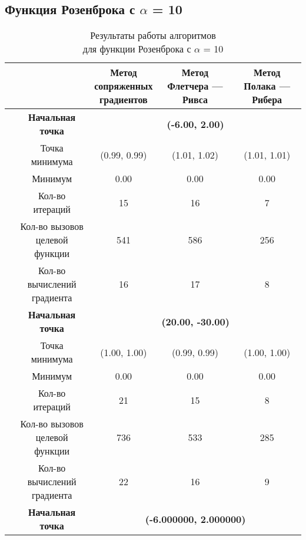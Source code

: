             \subsection{Функция Розенброка с $\alpha$ = 10}

\begin{table}[H]
        \centering
        \vspace*{-1.5em}
        \caption{Результаты работы алгоритмов\\для функции Розенброка с $\alpha$ = 10}
        \footnotesize
        \begin{tabular}{|c|c|c|c|c|}
        \hline
        & &\makecell{Метод\\сопряженных\\градиентов} &\makecell{Метод\\Флетчера --- Ривса} &\makecell{Метод\\Полака --- Рибера} \\
        \hline
	\multirow{10}{*}{\rotatebox[origin=c]{90}{$\varepsilon = 0.01$}}&\textbf{Начальная точка} &\multicolumn{3}{c|}{\textbf{(-6.00, 2.00)}}\\
	\cline{2-5}
	&Точка минимума &(0.99, 0.99) &(1.01, 1.02) &(1.01, 1.01) \\ 
	\cline{2-5}
	&Минимум &0.00 &0.00 &0.00 \\ 
	\cline{2-5}
	&Кол-во итераций &15 &16 &7 \\ 
	\cline{2-5}
	&\makecell{Кол-во вызовов\\целевой функции} &541 &586 &256 \\ 
	\cline{2-5}
	&\makecell{Кол-во вычислений\\градиента} &16 &17 &8 \\ 
	\cline{2-5}
\cline{2-5}&\textbf{Начальная точка} &\multicolumn{3}{c|}{\textbf{(20.00, -30.00)}}\\
	\cline{2-5}
	&Точка минимума &(1.00, 1.00) &(0.99, 0.99) &(1.00, 1.00) \\ 
	\cline{2-5}
	&Минимум &0.00 &0.00 &0.00 \\ 
	\cline{2-5}
	&Кол-во итераций &21 &15 &8 \\ 
	\cline{2-5}
	&\makecell{Кол-во вызовов\\целевой функции} &736 &533 &285 \\ 
	\cline{2-5}
	&\makecell{Кол-во вычислений\\градиента} &22 &16 &9 \\ 
	\cline{2-5}
	\hline
	\multirow{10}{*}{\rotatebox[origin=c]{90}{$\varepsilon = 1e-06$}}&\textbf{Начальная точка} &\multicolumn{3}{c|}{\textbf{(-6.000000, 2.000000)}}\\

\end{tabular}
\end{table}
